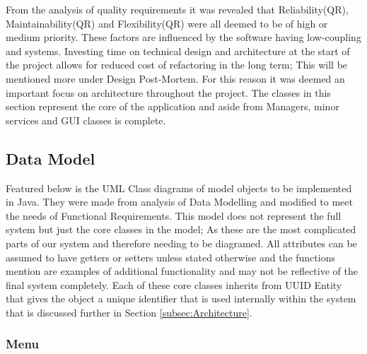 From the analysis of quality requirements it was revealed that Reliability(QR), Maintainability(QR) and Flexibility(QR) were all deemed to be of high or medium priority. These factors are influenced by the software having low-coupling and  systems. Investing time on technical design and architecture at the start of the project allows for reduced cost of refactoring in the long term; This will be mentioned more under Design Post-Mortem. For this reason it was deemed an important focus on architecture throughout the project. The classes in this section represent the core of the application and aside from Managers, minor services and GUI classes is complete.

\subsection{Data Model} \label{subsec:DataModel}
Featured below is the UML Class diagrams of model objects to be implemented in Java. They were made from analysis of Data Modelling and modified to meet the needs of Functional Requirements. This model does not represent the full system but just the core classes in the model; As these are the most complicated parts of our system and therefore needing to be diagramed. All attributes can be assumed to have getters or setters unless stated otherwise and the functions mention are examples of additional functionality and may not be reflective of the final system completely.
Each of these core classes inherits from UUID Entity that gives the object a unique identifier that is used internally within the system that is discussed further in Section \ref{subsec:Architecture}.

\subsubsection{Menu}

